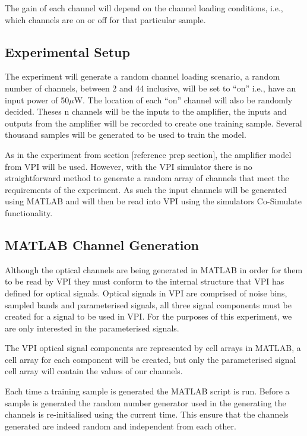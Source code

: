 The gain of each channel will depend on the channel loading conditions, i.e., which channels are on or off for that particular sample.



\subsection{Experimental Setup}


The experiment will generate a random channel loading scenario, a random number of channels, between 2 and 44 inclusive, will be set to “on” i.e., have an input power of 50$\mu$W. The location of each “on” channel will also be randomly decided. 
Theses n channels will be the inputs to the amplifier, the inputs and outputs from the amplifier will be recorded to create one training sample. Several thousand samples will be generated to be used to train the model. 

As in the experiment from section [reference prep section], the amplifier model from VPI will be used. However, with the VPI simulator there is no straightforward method to generate a random array of channels that meet the requirements of the experiment. 
As such the input channels will be generated using MATLAB and will then be read into VPI using the simulators Co-Simulate functionality. 


\subsection{MATLAB Channel Generation}

Although the optical channels are being generated in MATLAB in order for them to be read by VPI they must conform to the internal structure that VPI has defined for optical signals. 
Optical signals in VPI are comprised of noise bins, sampled bands and parameterised signals, all three signal components must be created for a signal to be used in VPI. 
For the purposes of this experiment, we are only interested in the parameterised signals.

The VPI optical signal components are represented by cell arrays in MATLAB, a cell array for each component will be created, but only the parameterised signal cell array will contain the values of our channels.  

Each time a training sample is generated the MATLAB script is run. Before a sample is generated the random number generator used in the generating the channels is re-initialised using the current time. This ensure that the channels generated are indeed random and independent from each other. 


